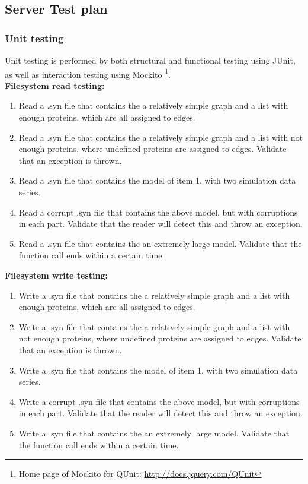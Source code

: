 \subsection{Server Test plan}

\subsubsection{Unit testing}
Unit testing is performed by both structural and functional testing using JUnit, as well as interaction testing using Mockito \footnote{Home page of Mockito for QUnit: \url{http://docs.jquery.com/QUnit}}.\\
\textbf{Filesystem read testing:
}\begin{enumerate}
\item Read a .syn file that contains the a relatively simple graph  and a list with enough proteins, which are all assigned to edges.

\item Read a .syn file that contains the a relatively simple graph  and a list with not enough proteins, where undefined proteins are assigned to edges. Validate that an exception is thrown.\item Read a .syn file that contains the  model of item 1, with two simulation data series.
\item Read a corrupt .syn file that contains the above model, but with corruptions in each part.
Validate that the reader will detect this and throw an exception.
\item Read a .syn file that contains the an extremely large model. Validate that the function call ends within a certain time.\end{enumerate}

\noindent \textbf{Filesystem write testing:}

\begin{enumerate}
\item Write a .syn file that contains the a relatively simple graph  and a list with enough proteins, which are all assigned to edges.

\item Write a .syn file that contains the a relatively simple graph  and a list with not enough proteins, where undefined proteins are assigned to edges. Validate that an exception is thrown.\item Write a .syn file that contains the  model of item 1, with two simulation data series.
\item Write a corrupt .syn file that contains the above model, but with corruptions in each part.
Validate that the reader will detect this and throw an exception.
\item Write a .syn file that contains the an extremely large model. Validate that the function call ends within a certain time.\end{enumerate}

